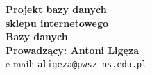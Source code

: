 \def\autor{Informatyka Stosowana III rok}
\def\tytul{\textbf{\LARGE Projektowanie bazy danych}}
\def\promotor{~}
\def\miejscerokwydania{Nowy Sącz \today}
\def\nazwauczelni{PAŃSTWOWA WYŻSZA SZKOŁA ZAWODOWA}
\def\imienia{INSTYTUT  TECHNICZNY}
\def\wydzial{Kierunek Informatyka Stosowana}

\thispagestyle{empty}
{
\hbox{}\textheight
\hspace{1cm}
\centering
\vbox{
\noindent\textbf{\Huge Projekt bazy danych \\ 
\vspace{0.3cm}sklepu internetowego}\vspace{0.5cm}\\
\noindent\textbf{\vspace{0.3cm}Bazy danych}\\
\noindent\textbf{Prowadzący: Antoni Ligęza}}\\
\noindent e-mail: \verb|aligeza@pwsz-ns.edu.pl|\\}